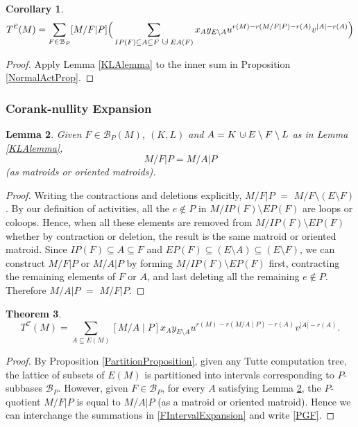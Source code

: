 \documentclass[12pt,leqno]{amsart}
\newtheorem{lem}{Lemma}
\newtheorem{cor}[lem]{Corollary}
\newtheorem{thm}[lem]{Theorem}
\theoremstyle{remark}
\newcommand{\dunion}
{\mbox{\hbox{\hskip6pt$\cdot$\hskip-5.50pt$\cup$\hskip2pt}}}
\newcommand{\Card}[1]{\ensuremath{{\left|#1\right|}}}
\begin{document}
\begin{cor}
\begin{equation}
\label{FIntervalExpansion}
T^{\mathcal{C}}(M)=
\sum_{F\in \mathcal{B}_P}[M/F|P]
\Big(
\sum_{IP(F)\subseteq A \subseteq F\dunion EA(F)}
 x_{A}
 y_{E\setminus A}
 u^{r(M)-r(M/F|P)-r(A)}
 v^{\Card{A}-r(A)}
\Big)
\end{equation}
\end{cor}

\begin{proof}
Apply Lemma \ref{KLAlemma} to the inner sum in
Proposition \ref{NormalActProp}.
\end{proof}

\subsubsection{Corank-nullity Expansion}


\begin{lem}
\label{FAMinorlemma}
Given $F\in\mathcal{B}_P(M)$, $(K,L)$ and $A=K\dunion E\setminus F\setminus L$
as in Lemma \ref{KLAlemma},
\[ M/F|P = M/A|P\]
(as matroids or oriented matroids).
\end{lem}
\begin{proof}
Writing the contractions and deletions explicitly, $M/F|P$ 
$=$ $M/F\setminus (E\setminus F)$.  By our definition of
activities, all the $e\not\in P$ in $M/IP(F)\setminus EP(F)$ are 
loops or coloops.  Hence, when all these elements are removed
from $M/IP(F)\setminus EP(F)$ whether by contraction or deletion, the
result is the same matroid or oriented matroid.  Since
$IP(F)\subseteq A\subseteq F$ and 
$EP(F)\subseteq (E\setminus A)\subseteq (E\setminus F)$, we 
can construct $M/F|P$ or $M/A|P$ by forming $M/IP(F)\setminus EP(F)$
first, contracting the remaining elements of $F$ or $A$,
and last deleting all the remaining $e\not\in P$.  
Therefore  $M/A|P$ $=$ $M/F|P$.
\end{proof}

\begin{thm}
\begin{equation}
\tag{PGF}
\label{PGF}
T^{\mathcal{C}}(M) = \sum_{A\subseteq E(M)}[M/A \mid P]x_A y_{E\setminus A}
u^{r(M)-r(M/A\mid P)-r(A)}
v^{|A|-r(A)}.
\end{equation}
\end{thm}

\begin{proof}
By Proposition \ref{PartitionProposition}, given any Tutte computation tree,
the lattice of subsets of $E(M)$ is partitioned
into intervals corresponding to $P$-subbases $\mathcal{B}_P$.  
However,  given $F\in\mathcal{B}_P$, for every $A$ satisfying
Lemma \ref{FAMinorlemma}, the $P$-quotient $M/F|P$ is equal to 
$M/A|P$ (as a matroid or oriented matroid).  Hence we can 
interchange the summations in \eqref{FIntervalExpansion} and write
\eqref{PGF}.
\end{proof}
\end{document}
